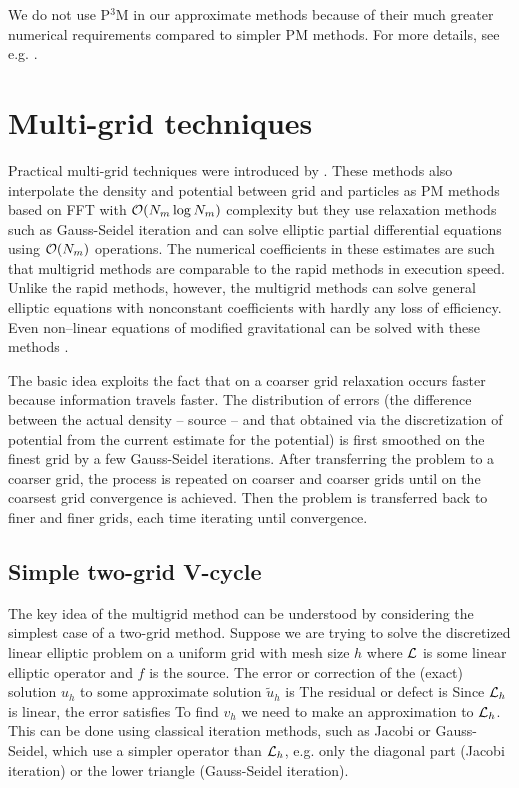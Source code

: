 We do not use P$^3$M in our approximate methods because of their much greater numerical requirements compared to simpler PM methods. For more details, see e.g. \textcite{Hockney:1988:CSU:62815}.
\section{Multi-grid techniques}
Practical multi-grid techniques were introduced by \textcite{10.2307/2006422}. These methods also interpolate the density and potential between grid and particles as PM methods based on FFT with $\mathcal{O}(N_m\log N_m)$ complexity but they use relaxation methods such as Gauss-Seidel iteration \parencite{doi:10.1002/zamm.19720520813} and can solve elliptic partial differential equations using $\mathcal{O}(N_m)$ operations. The numerical coefficients in these estimates are such that multigrid methods are comparable to the rapid methods in execution speed. Unlike the rapid methods, however, the multigrid methods can solve general elliptic equations with nonconstant coefficients with hardly any loss of efficiency. Even non--linear equations of modified gravitational can be solved with these methods \parencite{10.5555/42249}.

The basic idea exploits the fact that on a coarser grid relaxation occurs faster because information travels faster. The distribution of errors (the difference between the actual density -- source -- and that obtained via the discretization of potential from the current estimate for the potential) is first smoothed on the finest grid by a few Gauss-Seidel iterations. After transferring the problem to a coarser grid, the process is repeated on coarser and coarser grids until on the coarsest grid convergence is achieved. Then the problem is transferred back to finer and finer grids, each time iterating until convergence.
\subsection{Simple two-grid V-cycle}
The key idea of the multigrid method can be understood by considering the simplest case of a two-grid method. Suppose we are trying to solve the discretized linear elliptic problem on a uniform grid with mesh size $h$
where $\mathcal{L}$ is some linear elliptic operator and $f$ is the source. The error or correction of the (exact) solution $u_h$ to some approximate solution $\tilde u_h$ is
The residual or defect is
Since $\mathcal{L}_h$ is linear, the error satisfies
To find $v_h$ we need to make an approximation to $\mathcal{L}_h$. This can be done using classical iteration methods, such as Jacobi or Gauss-Seidel, which use a simpler operator than $\mathcal{L}_h$, e.g. only the diagonal part (Jacobi iteration) or the lower triangle (Gauss-Seidel iteration).

